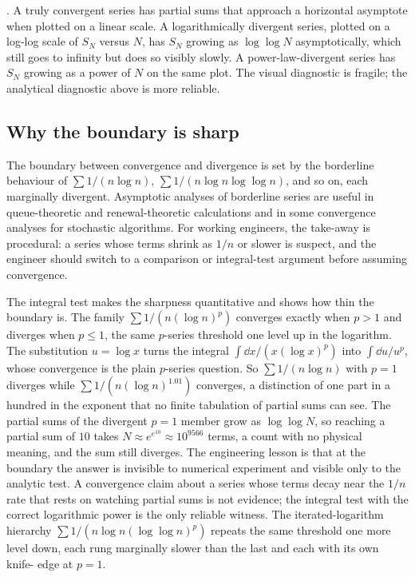 . A truly convergent
series has partial sums that approach a horizontal asymptote when
plotted on a linear scale. A logarithmically divergent series, plotted
on a log-log scale of $S_{N}$ versus $N$, has $S_{N}$ growing as
$\log \log N$ asymptotically, which still goes to infinity but does so
visibly slowly. A power-law-divergent series has $S_{N}$ growing as a
power of $N$ on the same plot. The visual diagnostic is fragile; the
analytical diagnostic above is more reliable.

\subsection{Why the boundary is sharp}

The boundary between convergence and divergence is set by the
borderline behaviour of $\sum 1/(n \log n)$, $\sum 1/(n \log n \log
\log n)$, and so on, each marginally divergent. Asymptotic analyses
of borderline series are useful in queue-theoretic and renewal-theoretic
calculations and in some convergence analyses for stochastic
algorithms. For working engineers, the take-away is procedural: a
series whose terms shrink as $1/n$ or slower is suspect, and the
engineer should switch to a comparison or integral-test argument
before assuming convergence.

The integral test makes the sharpness quantitative and shows how thin
the boundary is. The family $\sum 1/(n (\log n)^{p})$ converges exactly
when $p > 1$ and diverges when $p \leq 1$, the same $p$-series threshold
one level up in the logarithm. The substitution $u = \log x$ turns the
integral $\int \dd x /(x (\log x)^{p})$ into $\int \dd u / u^{p}$, whose
convergence is the plain $p$-series question. So $\sum 1/(n \log n)$ with
$p = 1$ diverges while $\sum 1/(n (\log n)^{1.01})$ converges, a
distinction of one part in a hundred in the exponent that no finite
tabulation of partial sums can see. The partial sums of the divergent
$p = 1$ member grow as $\log \log N$, so reaching a partial sum of $10$
takes $N \approx e^{e^{10}} \approx 10^{9566}$ terms, a count with no
physical meaning, and the sum still diverges. The engineering lesson is
that at the boundary the answer is invisible to numerical experiment and
visible only to the analytic test. A convergence claim about a series
whose terms decay near the $1/n$ rate that rests on watching partial sums
is not evidence; the integral test with the correct logarithmic power is
the only reliable witness. The iterated-logarithm hierarchy $\sum 1/(n
\log n (\log\log n)^{p})$ repeats the same threshold one more level down,
each rung marginally slower than the last and each with its own knife-
edge at $p = 1$.

